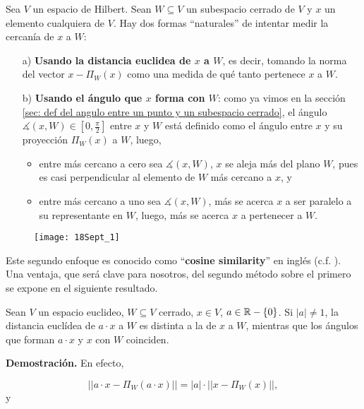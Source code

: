 Sea $V$ un espacio de Hilbert.
Sean $W \subseteq V$ un subespacio cerrado de $V$ y 
$x$ un elemento cualquiera de $V$. Hay dos formas ``naturales''
de intentar medir la cercanía de $x$ a $W$:
\begin{itemize}
\item[a)] \textbf{Usando la distancia euclidea
de $x$ a $W$}, es decir, tomando la norma del vector
$x - \Pi_{W}(x)$ como una medida
de qué tanto pertenece $x$ a $W$.
\item[b)] \textbf{Usando el ángulo que $x$ forma con $W$}: como ya
vimos en la sección 
\ref{sec: def del angulo entre un punto y un subespacio cerrado}, el ángulo 
$\measuredangle (x, W) \in [0, \frac{\pi}{2}]$
entre $x$ y $W$
está definido como el ángulo entre $x$ y su proyección
$\Pi_{W}(x)$ a $W$, luego, 
	\begin{itemize}
		\item entre más cercano a cero sea $\measuredangle (x, W)$,
		$x$ se aleja más del plano $W$, pues es casi perpendicular 
		al elemento de $W$ más cercano a $x$, y
		
		\item entre más cercano a uno sea $\measuredangle (x, W)$,
		más se acerca $x$ a ser paralelo a su representante en $W$,
		luego, más se acerca $x$ a pertenecer a $W$.
	\end{itemize}
\end{itemize}

\begin{figure}[H]
	\centering
	\texttt{[image:  18Sept\_1]} 
\end{figure}	

Este segundo
enfoque es conocido como ``\textbf{cosine similarity}'' en
inglés (c.f. \cite{cosineSim}). Una ventaja, que será clave
para nosotros, del segundo método sobre el primero se
expone en el siguiente resultado.


\begin{prop}
\label{prop: angulo se conserva bajo mult. esc.}
Sean $V$ un espacio euclideo, $W \subseteq V$ cerrado, $x \in V$,
$a \in \mathbb{R} - \{ 0 \}$. Si $|a| \neq 1$, la distancia euclídea 
de $a \cdot x$ a $W$ es distinta
a la de $x$ a $W$, mientras que los 
ángulos que forman $a \cdot x$ y $x$
con $W$ coinciden.
\end{prop}
\noindent
\textbf{Demostración.}
En efecto, 

\[
|| a \cdot x - \Pi_{W}(a \cdot x) || = |a| \cdot || x - \Pi_{W}(x) ||, 
\]
y

